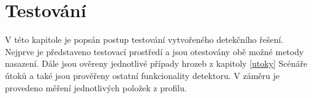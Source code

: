 \documentclass[thesis=M,czech]{FITthesis}[2012/06/26]
\begin{document}
 

\chapter{Testování}
V této kapitole je popsán postup testování vytvořeného detekčního řešení. Nejprve je představeno
testovací prostředí a jsou otestovány obě možné metody nasazení. Dále jsou ověreny jednotlivé 
případy hrozeb z kapitoly \ref{utoky} Scénáře útoků a také jsou prověřeny ostatní funkcionality
detektoru. V záměru je provedeno měření jednotlivých položek z profilu.

 

\begin{conclusion}
\end{conclusion}




\appendix
\end{document}
